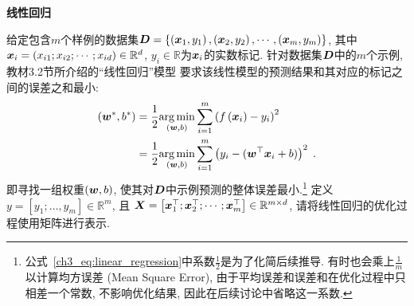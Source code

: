 \documentclass[answers]{exam}  %
\begin{document}
\begin{questions}
\begin{solution}


  \end{solution}


  \question [15] \textbf{线性回归}

  给定包含$m$个样例的数据集$\boldsymbol{D}=\left\{\left({\boldsymbol{x}}_{1}, y_{1}\right),\left({\boldsymbol{x}}_{2}, y_{2}\right), \cdots,\left({\boldsymbol{x}}_{m}, y_{m}\right)\right\}$, 其中${\boldsymbol{x}}_{i}=\left(x_{i 1} ; x_{i 2} ; \cdots ; x_{i d}\right) \in \mathbb{R}^{d}$, $y_{i} \in\mathbb{R}$为${\boldsymbol{x}}_{i}$的实数标记.
  针对数据集$\boldsymbol{D}$中的$m$个示例, 教材3.2节所介绍的“线性回归”模型 要求该线性模型的预测结果和其对应的标记之间的误差之和最小:
  \begin{align}
    \left(\boldsymbol{w}^{*}, b^{*}\right) & =\frac{1}{2}\underset{(\boldsymbol{w}, b)}{\arg \min } \sum_{i=1}^{m}\left(f\left({\boldsymbol{x}}_{i}\right)-y_{i}\right)^{2} \notag                            \\
                                & =\frac{1}{2}\underset{(\boldsymbol{w}, b)}{\arg \min } \sum_{i=1}^{m}\left(y_{i}-(\boldsymbol{w}^\top {\boldsymbol{x}}_{i}+b)\right)^{2}\;.\label{ch3_eq:linear_regression}
  \end{align}
  即寻找一组权重$(\boldsymbol{w}, b)$, 使其对$\boldsymbol{D}$中示例预测的整体误差最小.\footnote{公式~\ref{ch3_eq:linear_regression}中系数$\frac{1}{2}$是为了化简后续推导. 有时也会乘上$\frac{1}{m}$以计算均方误差 (Mean Square Error), 由于平均误差和误差和在优化过程中只相差一个常数, 不影响优化结果, 因此在后续讨论中省略这一系数.}
  定义$y=\left[y_{1}; \ldots, y_{m}\right] \in \mathbb{R}^{m}$, 且 $\boldsymbol{X}=\left[{\boldsymbol{x}}_{1}^\top ; {\boldsymbol{x}}_{2}^\top ; \cdots ; {\boldsymbol{x}}_{m}^\top\right] \in \mathbb{R}^{m \times d}$, 请将线性回归的优化过程使用矩阵进行表示.


\end{questions}
\end{document}
